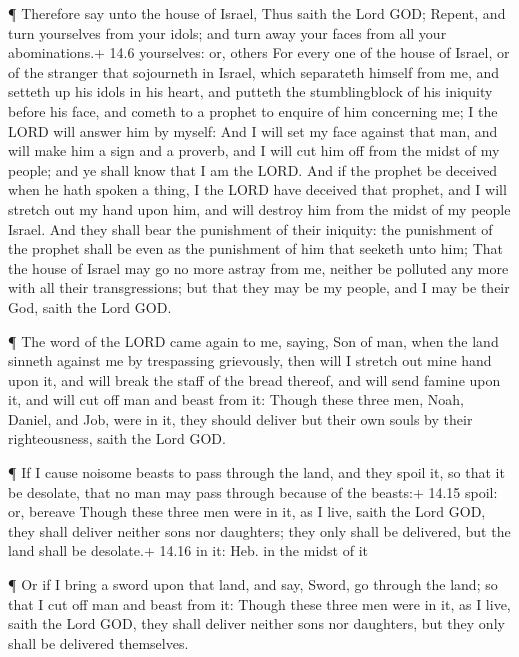  ¶ Therefore say unto the house of Israel, Thus saith the
Lord GOD; Repent, and turn yourselves from your idols; and turn away
your faces from all your abominations.+ 14.6 yourselves: or, others
 For every one of the house of Israel, or of the stranger
that sojourneth in Israel, which separateth himself from me, and setteth
up his idols in his heart, and putteth the stumblingblock of his
iniquity before his face, and cometh to a prophet to enquire of him
concerning me; I the LORD will answer him by myself:  And I
will set my face against that man, and will make him a sign and a
proverb, and I will cut him off from the midst of my people; and ye
shall know that I am the LORD.  And if the prophet be
deceived when he hath spoken a thing, I the LORD have deceived that
prophet, and I will stretch out my hand upon him, and will destroy him
from the midst of my people Israel.  And they shall bear
the punishment of their iniquity: the punishment of the prophet shall be
even as the punishment of him that seeketh unto him;  That
the house of Israel may go no more astray from me, neither be polluted
any more with all their transgressions; but that they may be my people,
and I may be their God, saith the Lord GOD.

 ¶ The word of the LORD came again to me, saying,
 Son of man, when the land sinneth against me by
trespassing grievously, then will I stretch out mine hand upon it, and
will break the staff of the bread thereof, and will send famine upon it,
and will cut off man and beast from it:  Though these three
men, Noah, Daniel, and Job, were in it, they should deliver but their
own souls by their righteousness, saith the Lord GOD.

 ¶ If I cause noisome beasts to pass through the land, and
they spoil it, so that it be desolate, that no man may pass through
because of the beasts:+ 14.15 spoil: or, bereave  Though
these three men were in it, as I live, saith the Lord GOD, they shall
deliver neither sons nor daughters; they only shall be delivered, but
the land shall be desolate.+ 14.16 in it: Heb. in the midst of it

 ¶ Or if I bring a sword upon that land, and say, Sword, go
through the land; so that I cut off man and beast from it: 
Though these three men were in it, as I live, saith the Lord GOD, they
shall deliver neither sons nor daughters, but they only shall be
delivered themselves.

